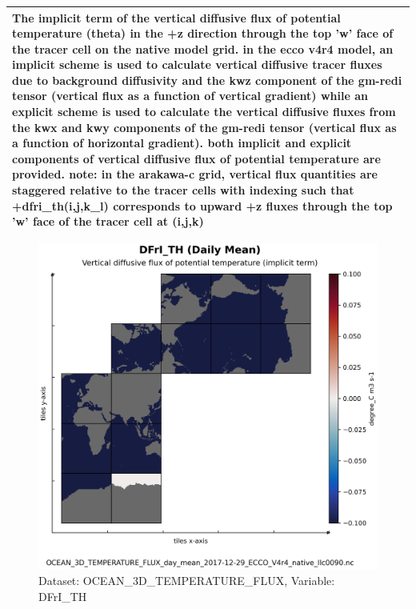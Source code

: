 \begin{longtable}{|m{}|m{}|m{}|m{}|}
\multicolumn{4}{|p{1\textwidth}|}{The implicit term of the vertical diffusive flux of potential temperature (theta) in the +z direction through the top 'w' face of the tracer cell on the native model grid. in the ecco v4r4 model, an implicit scheme is used to calculate vertical diffusive tracer fluxes due to background diffusivity and the kwz component of the gm-redi tensor (vertical flux as a function of vertical gradient) while an explicit scheme is used to calculate the vertical diffusive fluxes from the kwx and kwy components of the gm-redi tensor (vertical flux as a function of horizontal gradient). both implicit and explicit components of vertical diffusive flux of potential temperature are provided. note: in the arakawa-c grid, vertical flux quantities are staggered relative to the tracer cells with indexing such that +dfri\_th(i,j,k\_l) corresponds to upward +z fluxes through the top 'w' face of the tracer cell at (i,j,k)} \\ \hline
\end{longtable}

\begin{figure}[H]
\centering
\includegraphics[scale=0.55]{../images/plots/native_plots/Ocean_Three-Dimensional_Potential_Temperature_Fluxes/DFrI_TH.png}
\caption{Dataset: OCEAN\_3D\_TEMPERATURE\_FLUX, Variable: DFrI\_TH}
\label{tab:table-OCEAN_3D_TEMPERATURE_FLUX_DFrI_TH-Plot}
\end{figure}
\pagebreak
